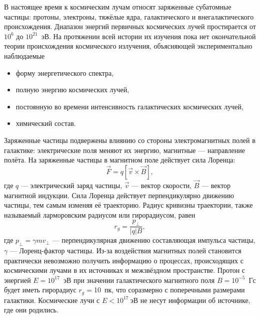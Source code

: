 \documentclass[magd,floatypics,numeref]{msudipl} %
\begin{document}
В настоящее время к космическим лучам относят заряженные субатомные частицы: протоны, электроны, тяжёлые ядра, галактического и внегалактического происхождения. Диапазон энергий первичных космических лучей простирается от $10^6$ до $10^{21}$~эВ. На протяжении всей истории их изучения пока нет окончательной теории происхождения космического излучения, объясняющей экспериментально наблюдаемые
\begin{itemize}
\item форму энергетического спектра,
\item полную энергию космических лучей,
\item постоянную во времени интенсивность галактических космических лучей,
\item химический состав.
\end{itemize}

Заряженные частицы подвержены влиянию со стороны электромагнитных полей в галактике: электрические поля меняют их энергию, магнитные --- направление полёта. На заряженные частицы в магнитном поле действует сила Лоренца:
\begin{equation}
\vec F = q\left[\vec v\times \vec B\right],
\end{equation}
где $q$ --- электрический заряд частицы, $\vec v$ --- вектор скорости, $\vec B$ --- вектор магнитной индукции. Сила Лоренца действует перпендикулярно движению частицы, тем самым изменяя её траекторию. Радиус кривизны траектории, также называемый ларморовским радиусом или гирорадиусом, равен
\begin{equation}
r_g = \frac{p_{\bot}}{|q|B},
\end{equation}
где $p_{\bot}=\gamma m v_{\bot}$ --- перпендикулярная движению составляющая импульса частицы, $\gamma$ --- Лоренц-фактор частицы. Из-за воздействия магнитных полей становится практически невозможно получить информацию о процессах, происходящих с космическими лучами в их источниках и межзвёздном пространстве. Протон с энергией $E=10^{17}$~эВ при значении галактического магнитного поля $B=10^{-5}$~Гс будет иметь гирорадиус $r_g=$10~пк, что соразмерно с поперечными размерами галактики. Космические лучи с $E<10^{17}~$эВ не несут информации об источнике, где они родились. 
\end{document}
